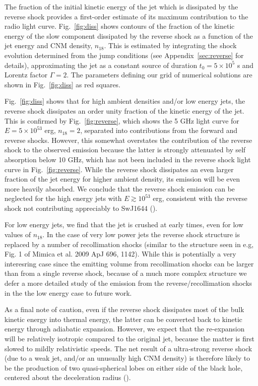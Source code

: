 \documentclass[usenatbib,fleqn]{mnras}
\begin{document}
The fraction of the initial kinetic energy of the jet which is
dissipated by the reverse shock provides a first-order estimate of its
maximum contribution to the radio light curve.  Fig.~\ref{fig:diss}
shows contours of the fraction of the kinetic energy of the slow
component dissipated by the reverse shock as a function of the jet
energy and CNM density, $n_{18}$.  This is estimated by integrating
the shock evolution determined from the jump conditions (see
Appendix~\ref{sec:reverse} for details), approximating the jet as a
constant source of duration $t_0 = 5 \times 10^{5}$ s and Lorentz
factor $\Gamma = 2$.  The parameters defining our grid of numerical
solutions are shown in Fig.~\ref{fig:diss} as red squares.


Fig.~\ref{fig:diss} shows that for high ambient densities and/or low
energy jets, the reverse shock dissipates an order unity fraction of
the kinetic energy of the jet.  This is confirmed by
Fig.~\ref{fig:reverse}, which shows the 5 GHz light curve for $E =
5\times 10^{53}$ erg, $n_{18} = 2$, separated into contributions from
the forward and reverse shocks.  However, this somewhat overstates the
contribution of the reverse shock to the observed emission because the
latter is strongly attenuated by self absorption below 10 GHz, which
has not been included in the reverse shock light curve in
Fig.~\ref{fig:reverse}.  While the reverse shock dissipates an even
larger fraction of the jet energy for higher ambient density, its
emission will be even more heavily absorbed.  We conclude that the
reverse shock emission can be neglected for the high energy jets with
$E\gtrsim 10^{53}$ erg, consistent with the reverse shock not
contributing appreciably to SwJ1644 (\citealt{Metzger+2012}).

For low energy jets, we find that the jet is crushed at early times,
even for low values of $n_{18}$. In the case of very low power jets
the reverse shock structure is replaced by a number of recollimation
shocks (similar to the structure seen in e.g, Fig. 1 of Mimica et
al. 2009 ApJ 696, 1142). While this is potentially a very interesring
case since the emitting volume from recollimation shocks can be larger
than from a single reverse shock, because of a much more complex
structure we defer a more detailed study of the emission from the
reverse/recollimation shocks in the the low energy case to future
work.


As a final note of caution, even if the reverse shock dissipates most
of the bulk kinetic energy into thermal energy, the latter can be
converted back to kinetic energy through adiabatic expansion.
However, we expect that the re-expansion will be relatively isotropic
compared to the original jet, because the matter is first slowed to
mildly relativistic speeds.  The net result of a ultra-strong reverse
shock (due to a weak jet, and/or an unusually high CNM density) is
therefore likely to be the production of two quasi-spherical lobes on
either side of the black hole, centered about the deceleration radius
(\citealt{Giannios&Metzger2011}).
\end{document}
